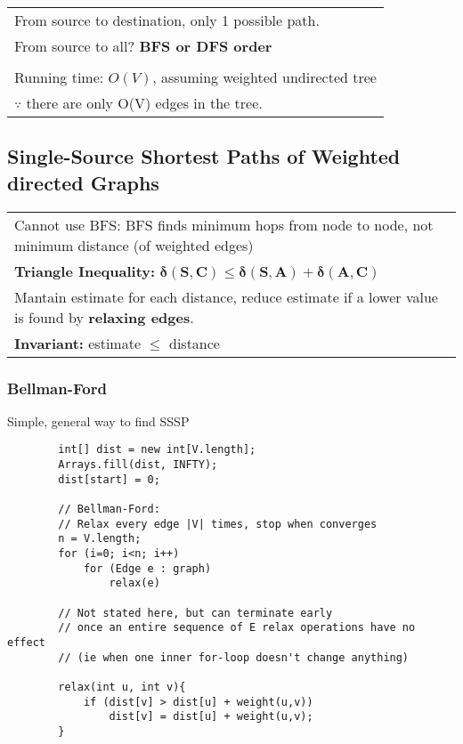 \documentclass{article}
\begin{document}
    \begin{tabular}{l}
        From source to destination, only 1 possible path.\\
        From source to all? \textbf{BFS or DFS order}\\\\
        Running time: $O(V)$, assuming weighted undirected tree\\
        $\because$ there are only O(V) edges in the tree.
    \end{tabular}


    \pagebreak

    \subsection{Single-Source Shortest Paths of Weighted directed Graphs}

    \begin{tabular}{l}
        Cannot use BFS: BFS finds minimum hops from node to node, not minimum distance (of weighted edges)\\
        \textbf{Triangle Inequality:} $\bm{\delta(S, C) \leq \delta(S, A) + \delta(A, C)}$\\
        Mantain estimate for each distance, reduce estimate if a lower value is found by \textbf{relaxing edges}.\\
        \textbf{Invariant:} estimate $\leq$ distance\\
    \end{tabular}

    \subsubsection{Bellman-Ford}

    Simple, general way to find SSSP

    \begin{verbatim}
        int[] dist = new int[V.length];
        Arrays.fill(dist, INFTY);
        dist[start] = 0;

        // Bellman-Ford:
        // Relax every edge |V| times, stop when converges
        n = V.length;
        for (i=0; i<n; i++)
            for (Edge e : graph)
                relax(e)

        // Not stated here, but can terminate early
        // once an entire sequence of E relax operations have no effect
        // (ie when one inner for-loop doesn't change anything)

        relax(int u, int v){
            if (dist[v] > dist[u] + weight(u,v))
                dist[v] = dist[u] + weight(u,v);
        }       
    \end{verbatim}
\end{document}
